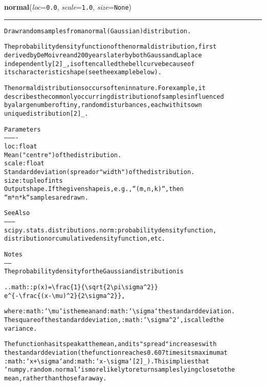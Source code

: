 \hspace{.8\funcindent}\begin{boxedminipage}{\funcwidth}

    \raggedright \textbf{normal}(\textit{loc}={\tt 0.0}, \textit{scale}={\tt 1.0}, \textit{size}={\tt None})

    \vspace{-1.5ex}

    \rule{\textwidth}{0.5\fboxrule}
\setlength{\parskip}{2ex}
\begin{alltt}
Draw random samples from a normal (Gaussian) distribution.

The probability density function of the normal distribution, first
derived by De Moivre and 200 years later by both Gauss and Laplace
independently [2]\_, is often called the bell curve because of
its characteristic shape (see the example below).

The normal distributions occurs often in nature.  For example, it
describes the commonly occurring distribution of samples influenced
by a large number of tiny, random disturbances, each with its own
unique distribution [2]\_.

Parameters
----------
loc : float
    Mean ("centre") of the distribution.
scale : float
    Standard deviation (spread or "width") of the distribution.
size : tuple of ints
    Output shape.  If the given shape is, e.g., ``(m, n, k)``, then
    ``m * n * k`` samples are drawn.

See Also
--------
scipy.stats.distributions.norm : probability density function,
    distribution or cumulative density function, etc.

Notes
-----
The probability density for the Gaussian distribution is

.. math:: p(x) = {\textbackslash}frac\{1\}\{{\textbackslash}sqrt\{ 2 {\textbackslash}pi {\textbackslash}sigma{\textasciicircum}2 \}\}
                 e{\textasciicircum}\{ - {\textbackslash}frac\{ (x - {\textbackslash}mu){\textasciicircum}2 \} \{2 {\textbackslash}sigma{\textasciicircum}2\} \},

where :math:`{\textbackslash}mu` is the mean and :math:`{\textbackslash}sigma` the standard deviation.
The square of the standard deviation, :math:`{\textbackslash}sigma{\textasciicircum}2`, is called the
variance.

The function has its peak at the mean, and its "spread" increases with
the standard deviation (the function reaches 0.607 times its maximum at
:math:`x + {\textbackslash}sigma` and :math:`x - {\textbackslash}sigma` [2]\_).  This implies that
`numpy.random.normal` is more likely to return samples lying close to the
mean, rather than those far away.


\end{alltt}
\end{boxedminipage}
